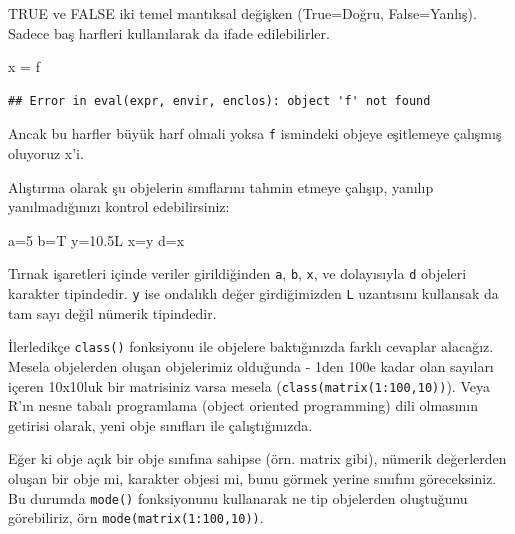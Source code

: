 \documentclass[
]{book}
\newenvironment{Shaded}{\begin{snugshade}}{\end{snugshade}}
\newcommand{\FloatTok}[1]{\textcolor[rgb]{0.00,0.00,0.81}{#1}}
\newcommand{\NormalTok}[1]{#1}
\newcommand{\OtherTok}[1]{\textcolor[rgb]{0.56,0.35,0.01}{#1}}
\newcommand{\StringTok}[1]{\textcolor[rgb]{0.31,0.60,0.02}{#1}}
\begin{document}
TRUE ve FALSE iki temel mantıksal değişken (True=Doğru, False=Yanlış). Sadece baş harfleri kullanılarak da ifade edilebilirler.

\begin{Shaded}
\begin{Highlighting}[]
\NormalTok{x }\OtherTok{=}\NormalTok{ f}
\end{Highlighting}
\end{Shaded}

\begin{verbatim}
## Error in eval(expr, envir, enclos): object 'f' not found
\end{verbatim}

Ancak bu harfler büyük harf olmali yoksa \texttt{f} ismindeki objeye eşitlemeye çalışmış oluyoruz x'i.

Alıştırma olarak şu objelerin sınıflarını tahmin etmeye çalışıp, yanılıp yanılmadığınızı kontrol edebilirsiniz:

\begin{Shaded}
\begin{Highlighting}[]
\NormalTok{a}\OtherTok{=}\StringTok{\textquotesingle{}5\textquotesingle{}} 
\NormalTok{b}\OtherTok{=}\StringTok{\textquotesingle{}T\textquotesingle{}}
\NormalTok{y}\OtherTok{=}\FloatTok{10.5}\NormalTok{L}
\NormalTok{x}\OtherTok{=}\StringTok{\textquotesingle{}y\textquotesingle{}}
\NormalTok{d}\OtherTok{=}\NormalTok{x}
\end{Highlighting}
\end{Shaded}

Tırnak işaretleri içinde veriler girildiğinden \texttt{a}, \texttt{b}, \texttt{x}, ve dolayısıyla \texttt{d} objeleri karakter tipindedir. \texttt{y} ise ondalıklı değer girdiğimizden \texttt{L} uzantısını kullansak da tam sayı değil nümerik tipindedir.

İlerledikçe \texttt{class()} fonksiyonu ile objelere baktığınızda farklı cevaplar alacağız. Mesela objelerden oluşan objelerimiz olduğunda - 1den 100e kadar olan sayıları içeren 10x10luk bir matrisiniz varsa mesela (\texttt{class(matrix(1:100,10))}). Veya R'ın nesne tabalı programlama (object oriented programming) dili olmasının getirisi olarak, yeni obje sınıfları ile çalıştığınızda.

Eğer ki obje açık bir obje sınıfına sahipse (örn. matrix gibi), nümerik değerlerden oluşan bir obje mi, karakter objesi mi, bunu görmek yerine sınıfını göreceksiniz. Bu durumda \texttt{mode()} fonksiyonunu kullanarak ne tip objelerden oluştuğunu görebiliriz, örn \texttt{mode(matrix(1:100,10))}.
\end{document}

